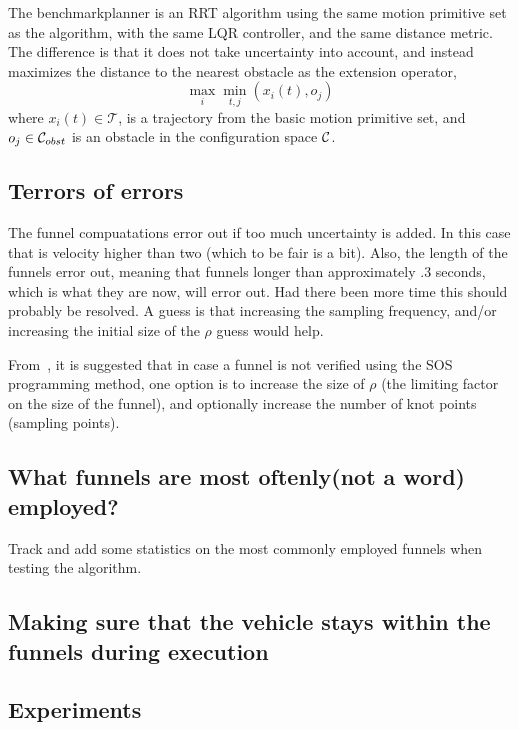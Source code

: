 The benchmarkplanner is an \ac{RRT} algorithm using the same motion primitive
set as the \rrtfunnel{} algorithm, with the same \ac{LQR} controller, and the
same distance metric. The difference is that it does not take uncertainty into
account, and instead maximizes the distance to the nearest obstacle as the
extension operator, \ie{}
\begin{equation}
  \max_{i}\min_{t,j}(x_{i}(t), o_{j})
\end{equation}
where \(x_{i}(t) \in \mathcal{T}\), is a trajectory from the basic motion
primitive set, and \(o_{j} \in \mathcal{C}_{obst}{}\) is an obstacle
in the configuration space \(\mathcal{C}{}\).

\subsection{Terrors of errors}

The funnel compuatations error out if too much uncertainty is added. In this
case that is velocity higher than two (which to be fair is a bit). Also, the
length of the funnels error out, meaning that funnels longer than approximately
.3 seconds, which is what they are now, will error out. Had there been more time
this should probably be resolved. A guess is that increasing the sampling
frequency, and/or increasing the initial size of the \(\rho\) guess would help.

From~\cite{tobenkinInvariantFunnelsTrajectories2010}, it is suggested that in
case a funnel is not verified using the \ac{SOS} programming method, one option
is to increase the size of \(\rho\) (the limiting factor on the size of the
funnel), and optionally increase the number of knot points (sampling points).

\subsection{What funnels are most oftenly(not a word) employed?}

Track and add some statistics on the most commonly employed funnels when testing
the algorithm.

\subsection{Making sure that the vehicle stays within the funnels during execution}


\subsection{Experiments}

